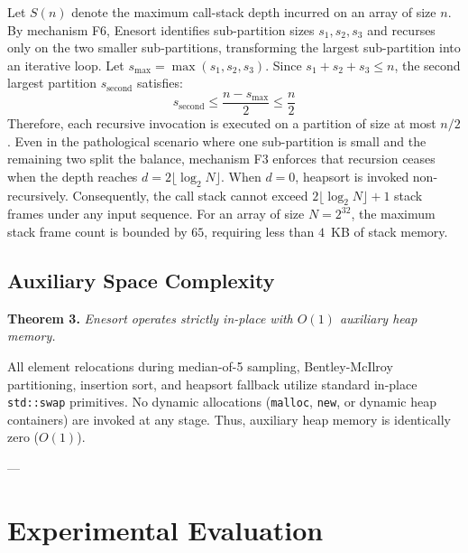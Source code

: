 \documentclass[journal]{IEEEtran}
\begin{document}
\begin{IEEEproof}
Let $S(n)$ denote the maximum call-stack depth incurred on an array of size $n$. By mechanism F6, Enesort identifies sub-partition sizes $s_1, s_2, s_3$ and recurses only on the two smaller sub-partitions, transforming the largest sub-partition into an iterative loop. 
Let $s_{\max} = \max(s_1, s_2, s_3)$. Since $s_1 + s_2 + s_3 \le n$, the second largest partition $s_{\text{second}}$ satisfies:
\begin{equation}
    s_{\text{second}} \le \frac{n - s_{\max}}{2} \le \frac{n}{2}
\end{equation}
Therefore, each recursive invocation is executed on a partition of size at most $n/2$. Even in the pathological scenario where one sub-partition is small and the remaining two split the balance, mechanism F3 enforces that recursion ceases when the depth reaches $d = 2 \lfloor \log_2 N \rfloor$. When $d=0$, heapsort is invoked non-recursively. Consequently, the call stack cannot exceed $2 \lfloor \log_2 N \rfloor + 1$ stack frames under any input sequence. For an array of size $N = 2^{32}$, the maximum stack frame count is bounded by $65$, requiring less than $4$~KB of stack memory.
\end{IEEEproof}

\subsection{Auxiliary Space Complexity}
\textbf{Theorem 3.} \textit{Enesort operates strictly in-place with $O(1)$ auxiliary heap memory.}

\begin{IEEEproof}
All element relocations during median-of-5 sampling, Bentley-McIlroy partitioning, insertion sort, and heapsort fallback utilize standard in-place \texttt{std::swap} primitives. No dynamic allocations (\texttt{malloc}, \texttt{new}, or dynamic heap containers) are invoked at any stage. Thus, auxiliary heap memory is identically zero ($O(1)$).
\end{IEEEproof}

---

\section{Experimental Evaluation}
\end{document}
